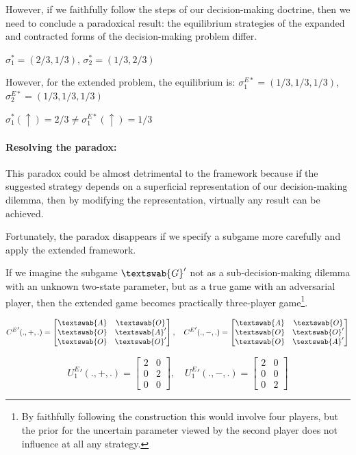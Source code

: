 \documentclass{article}
\begin{document}
However, if we faithfully follow the steps of our decision-making doctrine, then we need to conclude a paradoxical result: the equilibrium strategies of the expanded and contracted forms of the decision-making problem differ.


$\sigma^*_1=(2/3,1/3)$, $\sigma^*_2=(1/3,2/3)$

However, for the extended problem, the equilibrium is:
$\sigma^{E*}_1=(1/3,1/3,1/3)$, $\sigma^{E*}_2=(1/3,1/3,1/3)$

$\sigma^*_1(\uparrow) = 2/3 \neq \sigma^{E*}_1(\uparrow) = 1/3$

\paragraph{Resolving the paradox:}
This paradox could be almost detrimental to the framework because if the suggested strategy depends on a superficial representation of our decision-making dilemma, then by modifying the representation, virtually any result can be achieved.

Fortunately, the paradox disappears if we specify a subgame more carefully and apply the extended framework.

If we imagine the subgame $\textswab{G}'$ not as a sub-decision-making dilemma with an unknown two-state parameter, but as a true game with an adversarial player, then the extended game becomes practically three-player game\footnote{By faithfully following the construction this would involve four players, but the prior for the uncertain parameter viewed by the second player does not influence at all any strategy.}.


\[
{C^E}'(.,+,.)=
\begin{bmatrix}
\textswab{A} & \textswab{O} \\
\textswab{O} & \textswab{A}' \\
\textswab{O} & \textswab{O}'
\end{bmatrix}, \quad
{C^E}'(.,-,.)=
\begin{bmatrix}
\textswab{A} & \textswab{O} \\
\textswab{O} & \textswab{O}' \\
\textswab{O} & \textswab{A}'
\end{bmatrix}
\]

\[
{U^E_1}'(.,+,.)=
\begin{bmatrix}
2 & 0 \\
0 & 2 \\
0 & 0
\end{bmatrix}, \quad
{U^E_1}'(.,-,.)=
\begin{bmatrix}
2 & 0 \\
0 & 0 \\
0 & 2
\end{bmatrix}
\]
\end{document}
